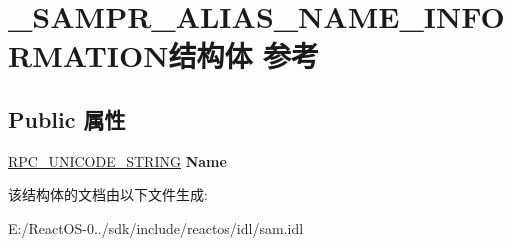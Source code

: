 \hypertarget{struct___s_a_m_p_r___a_l_i_a_s___n_a_m_e___i_n_f_o_r_m_a_t_i_o_n}{}\section{\+\_\+\+S\+A\+M\+P\+R\+\_\+\+A\+L\+I\+A\+S\+\_\+\+N\+A\+M\+E\+\_\+\+I\+N\+F\+O\+R\+M\+A\+T\+I\+O\+N结构体 参考}
\label{struct___s_a_m_p_r___a_l_i_a_s___n_a_m_e___i_n_f_o_r_m_a_t_i_o_n}
\subsection*{Public 属性}
\begin{DoxyCompactItemize}
\item 
\mbox{\label{struct___s_a_m_p_r___a_l_i_a_s___n_a_m_e___i_n_f_o_r_m_a_t_i_o_n_a7b2dc0c6242e1e2b2c738946d5a73ff5}} 
\hyperlink{struct___r_p_c___u_n_i_c_o_d_e___s_t_r_i_n_g}{R\+P\+C\+\_\+\+U\+N\+I\+C\+O\+D\+E\+\_\+\+S\+T\+R\+I\+NG} {\bfseries Name}
\end{DoxyCompactItemize}


该结构体的文档由以下文件生成\+:\begin{DoxyCompactItemize}
\item 
E\+:/\+React\+O\+S-\/0../sdk/include/reactos/idl/sam.\+idl\end{DoxyCompactItemize}
